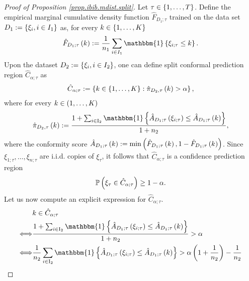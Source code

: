 \documentclass[11pt]{article}
\begin{document}
\begin{proof}[Proof of Proposition \ref{prop.ibib.mdist.split}]
Let $\tau \in \left\{ 1, \ldots, T \right\}$.
Define the empirical marginal cumulative density function $\hat{F}_{D_1; \tau}$ trained on the data set
$D_{1} := \left\{ \xi_{i}, i \in I_1 \right\}$ as, for every $k \in \left\{ 1, \ldots, K \right\}$
\begin{align}
\label{eq.ecdf.D1}
\hat{F}_{D_1; \tau} \paren{k} := \frac{1}{n_1} \sum_{i \in I_1} \mathbbm{1} \brac{\xi_{i; \tau} \leq k}.
\end{align}
%
%
%
Upon the dataset $D_{2} := \left\{ \xi_{i}, i \in I_2 \right\}$,
one can define split conformal prediction region $\hat{C}_{\alpha; \tau}$ as
\begin{align*}
    \hat{C}_{\alpha; \tau}
    := \left\{ 
        k \in \left\{ 1, \ldots, K \right\}
        : \hat{\pi}_{D_2, \tau} \left( k \right) > \alpha
     \right\},
\end{align*}
where for every $k \in \left( 1, \ldots, K \right)$
\begin{align*}
    \hat{\pi}_{D_2, \tau} \paren{k}
    := \frac{
        1 + \sum_{i \in \mathrm{I_2}}
        \mathbbm{1}
        \brac{
            \hat{A}_{D_1; \tau} \paren{\xi_{i; \tau}}
            \leq
            \hat{A}_{D_1; \tau} \paren{k}
        }
    }{1+ n_2},
\end{align*}
where the conformity score $\hat{A}_{D_1; \tau} \left( k \right) := \min \left( \hat{F}_{D_1; \tau} \left( k \right), 1 - \hat{F}_{D_1; \tau} \left( k \right) \right)$.
%
%
%
Since $\xi_{1; \tau}, \ldots, \xi_{n; \tau}$ are i.i.d. copies of $\xi_{\tau}$,
it follows that $\hat{C}_{\alpha; \tau}$ is a confidence prediction region
\begin{align*}
    \mathbb{P}
    \left( 
        \xi_{\tau} \in \hat{C}_{\alpha; \tau}
     \right) \geq 1 - \alpha.
\end{align*}
%
%
%
Let us now compute an explicit expression for $\hat{C}_{\alpha; \tau}$.
\begin{align*}
    &k \in \hat{C}_{\alpha; \tau}
    \\
    \Longleftrightarrow
    &\frac{
        1 + \sum_{i \in \mathrm{I_2}}
        \mathbbm{1}
        \brac{
            \hat{A}_{D_1; \tau} \paren{\xi_{i; \tau}}
            \leq
            \hat{A}_{D_1; \tau} \paren{k}
        }
    }{1+ n_2} > \alpha
    \\
    \Longleftrightarrow
    &\frac{
        1
    }{n_2}
    \sum_{i \in \mathrm{I_2}}
    \mathbbm{1}
    \brac{
        \hat{A}_{D_1; \tau} \paren{\xi_{i; \tau}}
        \leq
        \hat{A}_{D_1; \tau} \paren{k}
    } > \alpha \paren{1 + \frac{1}{n_2}} - \frac{1}{n_2}

\end{align*}
\end{proof}
\end{document}
